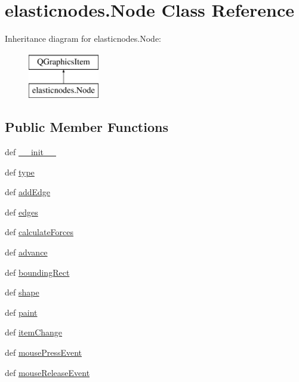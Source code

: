 \hypertarget{classelasticnodes_1_1Node}{}\section{elasticnodes.\+Node Class Reference}
\label{classelasticnodes_1_1Node}
Inheritance diagram for elasticnodes.\+Node\+:\begin{figure}[H]
\begin{center}
\leavevmode
\includegraphics[height=2.000000cm]{classelasticnodes_1_1Node}
\end{center}
\end{figure}
\subsection*{Public Member Functions}
\begin{DoxyCompactItemize}
\item 
def \hyperlink{classelasticnodes_1_1Node_adfaf5cc598f9458677b579d2eb39e45e}{\+\_\+\+\_\+init\+\_\+\+\_\+}
\item 
def \hyperlink{classelasticnodes_1_1Node_aaa9b8611650b580df9669187bc1fe5b4}{type}
\item 
def \hyperlink{classelasticnodes_1_1Node_a75fad6bb212bb0c9e287ba0bcf3e1ab5}{add\+Edge}
\item 
def \hyperlink{classelasticnodes_1_1Node_ab0b2fa634aecdca175124ce11a163fef}{edges}
\item 
def \hyperlink{classelasticnodes_1_1Node_ab668c7ba4f7f881b9d7566c70547474e}{calculate\+Forces}
\item 
def \hyperlink{classelasticnodes_1_1Node_a996602f361463100545e67ae78c659b5}{advance}
\item 
def \hyperlink{classelasticnodes_1_1Node_ae5238f995e92fdcbc2cf33db6ee2c215}{bounding\+Rect}
\item 
def \hyperlink{classelasticnodes_1_1Node_abee6c372560bd70423535d3bab8c76b3}{shape}
\item 
def \hyperlink{classelasticnodes_1_1Node_a7f41e6bc8f84fa53d0320d9b29739ee7}{paint}
\item 
def \hyperlink{classelasticnodes_1_1Node_a80fc8c0bb894a00ce1931004089b4b6d}{item\+Change}
\item 
def \hyperlink{classelasticnodes_1_1Node_ad472de34ae7c730205b70581014cc463}{mouse\+Press\+Event}
\item 
def \hyperlink{classelasticnodes_1_1Node_a3f0c98bd66a7f4874d70fde81109f521}{mouse\+Release\+Event}
\end{DoxyCompactItemize}
